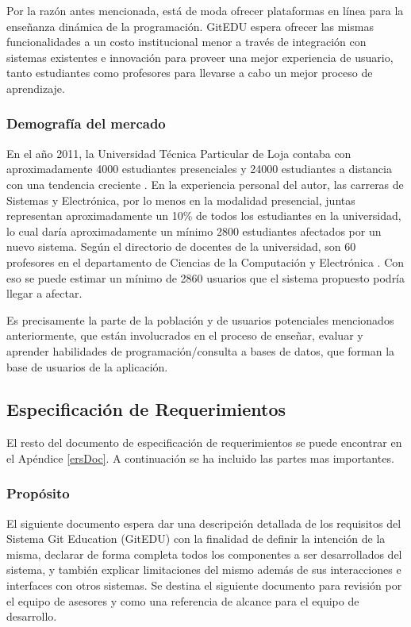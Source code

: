 Por la razón antes mencionada, está de moda ofrecer plataformas en línea para la enseñanza dinámica de la programación. GitEDU espera ofrecer las mismas funcionalidades a un costo institucional menor a través de integración con sistemas existentes e innovación para proveer una mejor experiencia de usuario, tanto estudiantes como profesores para llevarse a cabo un mejor proceso de aprendizaje.

\subsubsection{Demografía del mercado}
En el año 2011, la Universidad Técnica Particular de Loja contaba con aproximadamente 4000 estudiantes presenciales y 24000 estudiantes a distancia con una tendencia creciente \citep{UTPL-Datos-Estadisticos}. En la experiencia personal del autor, las carreras de Sistemas y Electrónica, por lo menos en la modalidad presencial, juntas representan aproximadamente un 10\% de todos los estudiantes en la universidad, lo cual daría aproximadamente un mínimo 2800 estudiantes afectados por un nuevo sistema. Según el directorio de docentes de la universidad, son 60 profesores en el departamento de Ciencias de la Computación y Electrónica \citep{UTPL-Directorio-Docentes}. Con eso se puede estimar un mínimo de 2860 usuarios que el sistema propuesto podría llegar a afectar.

Es precisamente la parte de la población y de usuarios potenciales mencionados anteriormente, que están involucrados en el proceso de enseñar, evaluar y aprender habilidades de programación/consulta a bases de datos, que forman la base de usuarios de la aplicación.

\subsection{Especificación de Requerimientos}
El resto del documento de especificación de requerimientos se puede encontrar en el Apéndice \ref{ersDoc}. A continuación se ha incluido las partes mas importantes.

\subsubsection{Propósito}
El siguiente documento espera dar una descripción detallada de los requisitos del Sistema Git Education (GitEDU) con la finalidad de definir la intención de la misma, declarar de forma completa todos los componentes a ser desarrollados del sistema, y también explicar limitaciones del mismo además de sus interacciones e interfaces con otros sistemas. Se destina el siguiente documento para revisión por el equipo de asesores y como una referencia de alcance para el equipo de desarrollo.

